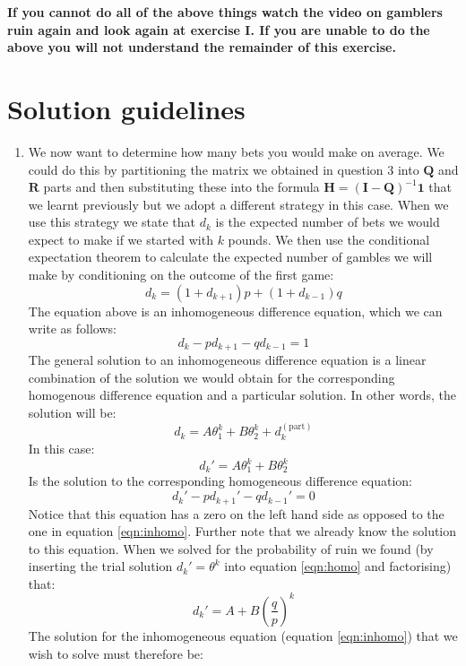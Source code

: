 \documentclass[paper=a4, fontsize=11pt]{scrartcl}
\def\bf{\normalfont\bfseries}
\numberwithin{equation}{section}
\numberwithin{figure}{section}
\numberwithin{table}{section}
\begin{document}
{\bf If you cannot do all of the above things watch the video on gamblers ruin again and look again at exercise I.  If you are unable to do the above you will not understand the remainder of this 
exercise.}

\section*{Solution guidelines}

\begin{enumerate}
 \item We now want to determine how many bets you would make on average.  We could do this by partitioning the matrix we obtained in question 3 into $\mathbf{Q}$ and $\mathbf{R}$ 
parts and then substituting these into the formula $\mathbf{H} = (\mathbf{I} - \mathbf{Q})^{-1} \mathbf{1}$ that we learnt previously but we adopt a different strategy in this case.   When 
we use this strategy we state that $d_k$ is the expected number of bets we would expect to make if we started with $k$ pounds.  We then use the conditional expectation theorem to calculate the 
expected number of gambles we will make by conditioning on the outcome of the first game:
\[
 d_k = (1+d_{k+1})p + (1 + d_{k-1})q
\]
The equation above is an inhomogeneous difference equation, which we can write as follows:
\begin{equation}
 d_k - pd_{k+1} - qd_{k-1} = 1
 \label{eqn:inhomo}
\end{equation}
The general solution to an inhomogeneous difference equation is a linear combination of the solution we would obtain for the corresponding homogenous difference equation and a particular 
solution.  In other words, the solution will be:
\[
d_k =  A \theta_1^k + B \theta_2^k + d^{(\textrm{part})}_k %
\]
In this case:
$$
d_k' = A \theta_1^k + B \theta_2^k
$$
Is the solution to the corresponding homogeneous difference equation:
\begin{equation}
d_k' - pd_{k+1}' - qd_{k-1}' = 0
\label{eqn:homo}
\end{equation}
Notice that this equation has a zero on the left hand side as opposed to the one in equation \ref{eqn:inhomo}.  Further note that we already know the solution to this equation.  When we solved for 
the probability of ruin we found (by inserting the trial solution $d_k' = \theta^k$ into equation \ref{eqn:homo} and factorising) that:
$$
d_k' = A + B \left( \frac{q}{p} \right)^k
$$
The solution for the inhomogeneous equation (equation \ref{eqn:inhomo}) that we wish to solve must therefore be:

\end{enumerate}
\end{document}
